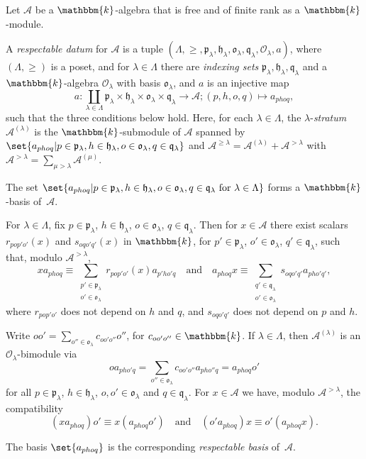 \documentclass[a4paper,11pt]{amsart}
\numberwithin{equation}{subsection}
\theoremstyle{definition}
\theoremstyle{theorem}
\theoremstyle{remark}
\newcommand\CA{\mathcal{A}}
\newcommand\CO{\mathcal{O}}
\newcommand\plam[1][\lambda]{\mathfrak{p}_{#1}}
\newcommand\hlam[1][\lambda]{\mathfrak{h}_{#1}}
\newcommand\qlam[1][\lambda]{\mathfrak{q}_{#1}}
\newcommand\Olam[1][\lambda]{\CO_{#1}}
\newcommand\olam[1][\lambda]{\mathfrak{o}_{#1}}
\newcommand\kk{\mathbbm{k}}
\begin{document}
    \begin{Definition}\label{D:Respectable}
    Let $\CA$ be a $\kk$-algebra that is free and of finite rank as a
    $\kk$-module.

    A \emph{respectable datum} for $\CA$ is a tuple
    $(\Lambda,\ge,\plam,\hlam,\olam,\qlam,\Olam,a)$, where
    $(\Lambda,\ge)$ is a poset, and for $\lambda\in\Lambda$ there
    are \emph{indexing sets} $\plam,\hlam,\qlam$ and a $\kk$-algebra
    $\Olam$ with basis $\olam$, and $a$ is an injective map
    \[
      a\colon\coprod_{\lambda\in\Lambda}
      \plam\times\hlam\times\olam\times\qlam\to \CA; (p,h,o,q)\mapsto a_{phoq},
    \]
    such that the three conditions below hold. Here, for each $\lambda\in\Lambda$,  the  $\lambda$-\emph{stratum} $\CA^{(\lambda)}$ is the $\kk$-submodule of $\CA$ spanned by
    $\set{a_{phoq}|p\in\plam,h\in\hlam,o\in\olam, q\in\qlam}$
    and $\CA^{\ge\lambda}=\CA^{(\lambda)}+\CA^{>\lambda}$ with $\CA^{>\lambda}=\sum_{\mu>\lambda}\CA^{(\mu)}$.
  \begin{thmenumerate}[label=\upshape(R\arabic*), ref=\upshape(R\arabic*)]
  \item\label{resp1}  The set
      $\set{a_{phoq}|p\in\plam,h\in\hlam, o\in\olam, q\in\qlam\text{ for
      }\lambda\in\Lambda}$ forms a $\kk$-basis of~$\CA$.
    \item\label{resp2} For $\lambda\in\Lambda$, fix $p\in\plam$, $h\in\hlam$, $o\in\olam$,  $q\in\qlam$. Then for $x\in \CA$ there exist scalars
      $r_{pop'o'}(x)$ and $s_{oqo'q'}(x)$ in $\kk$,
      for $p'\in\plam$, $o'\in\olam$, $q'\in\qlam$, such that, modulo $\CA^{>\lambda}$,
      \[
        xa_{phoq}\equiv\sum_{\substack{p'\in\plam\\o'\in\olam}}r_{pop'o'}(x)a_{p'ho'q}
        \quad\text{and}\quad
        a_{phoq}x\equiv\sum_{\substack{q'\in\qlam\\o'\in\olam}}s_{oqo'q'}a_{pho'q'},
      \]
      where $r_{pop'o'}$ does not depend on $h$ and $q$, and
      $s_{oqo'q'}$ does not depend on $p$ and $h$.
      \item\label{resp3}  Write $oo'=\sum_{o''\in\olam}c_{oo'o''}o''$, for
      $c_{oo'o''}\in\kk$. If $\lambda\in\Lambda$, then
      $\CA^{(\lambda)}$ is an $\Olam$-bimodule via
      \[
          oa_{pho'q} = \sum_{o''\in\olam}c_{oo'o''}a_{pho''q}
             = a_{phoq}o'
      \]
      for all $p\in\plam$, $h\in\hlam$, $o,o'\in\olam$ and $q\in\qlam$. For
      $x\in \CA$ we have, modulo $\CA^{>\lambda}$, the compatibility
      \[
        (xa_{phoq})o'\equiv x(a_{phoq}o')
        \quad\text{and}\quad
        (o'a_{phoq})x\equiv o'(a_{phoq}x).
      \]

    \end{thmenumerate}
    The basis $\set{a_{phoq}}$ is the corresponding \emph{respectable basis} of~$\CA$.
    \end{Definition}
\end{document}
